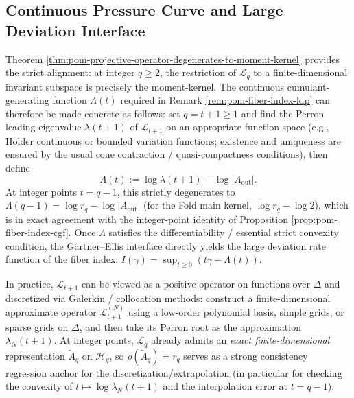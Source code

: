 \subsection{Continuous Pressure Curve and Large Deviation Interface}
\begin{remark}\label{rem:pom-projective-pressure-route}
Theorem \ref{thm:pom-projective-operator-degenerates-to-moment-kernel} provides the strict alignment: at integer \(q\ge 2\), the restriction of \(\mathcal{L}_q\) to a finite-dimensional invariant subspace is precisely the moment-kernel.
The continuous cumulant-generating function \(\Lambda(t)\) required in Remark \ref{rem:pom-fiber-index-ldp} can therefore be made concrete as follows: set \(q=t+1\ge 1\) and find the Perron leading eigenvalue \(\lambda(t+1)\) of \(\mathcal{L}_{t+1}\) on an appropriate function space (e.g., H\"older continuous or bounded variation functions; existence and uniqueness are ensured by the usual cone contraction / quasi-compactness conditions), then define
\[
\Lambda(t):=\log\lambda(t+1)-\log|A_{\mathrm{out}}|.
\]
At integer points \(t=q-1\), this strictly degenerates to
\(
\Lambda(q-1)=\log r_q-\log|A_{\mathrm{out}}|
\)
(for the Fold main kernel, \(\log r_q-\log 2\)), which is in exact agreement with the integer-point identity of Proposition \ref{prop:pom-fiber-index-cgf}.
Once \(\Lambda\) satisfies the differentiability / essential strict convexity condition, the G\"artner--Ellis interface directly yields the large deviation rate function of the fiber index: \(I(\gamma)=\sup_{t\ge 0}(t\gamma-\Lambda(t))\).
\end{remark}

\begin{remark}\label{rem:pom-projective-pressure-numerics}
In practice, \(\mathcal{L}_{t+1}\) can be viewed as a positive operator on functions over \(\Delta\) and discretized via Galerkin / collocation methods:
construct a finite-dimensional approximate operator \(\mathcal{L}_{t+1}^{(N)}\) using a low-order polynomial basis, simple grids, or sparse grids on \(\Delta\), and then take its Perron root as the approximation \(\lambda_N(t+1)\).
At integer points, \(\mathcal{L}_{q}\) already admits an \emph{exact finite-dimensional} representation \(\widetilde A_q\) on \(\mathcal{H}_q\), so \(\rho(\widetilde A_q)=r_q\) serves as a strong consistency regression anchor for the discretization/extrapolation (in particular for checking the convexity of \(t\mapsto \log\lambda_N(t+1)\) and the interpolation error at \(t=q-1\)).
\end{remark}
